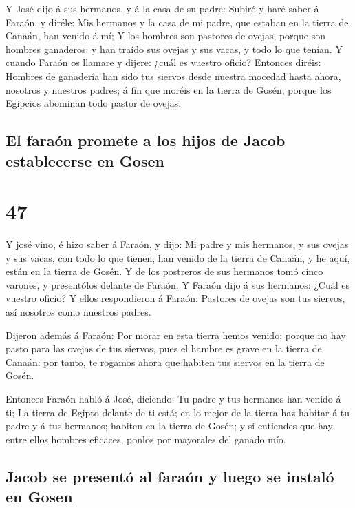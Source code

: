  Y José dijo á sus hermanos, y á la casa de su padre:
Subiré y haré saber á Faraón, y diréle: Mis hermanos y la casa de mi
padre, que estaban en la tierra de Canaán, han venido á mí;
 Y los hombres son pastores de ovejas, porque son hombres
ganaderos: y han traído sus ovejas y sus vacas, y todo lo que tenían.
 Y cuando Faraón os llamare y dijere: ¿cuál es vuestro
oficio?  Entonces diréis: Hombres de ganadería han sido tus
siervos desde nuestra mocedad hasta ahora, nosotros y nuestros padres; á
fin que moréis en la tierra de Gosén, porque los Egipcios abominan todo
pastor de ovejas.

\hypertarget{el-farauxf3n-promete-a-los-hijos-de-jacob-establecerse-en-gosen}{%
\subsection{El faraón promete a los hijos de Jacob establecerse en
Gosen}\label{el-farauxf3n-promete-a-los-hijos-de-jacob-establecerse-en-gosen}}

\hypertarget{section-46}{%
\section{47}\label{section-46}}

 Y josé vino, é hizo saber á Faraón, y dijo: Mi padre y mis
hermanos, y sus ovejas y sus vacas, con todo lo que tienen, han venido
de la tierra de Canaán, y he aquí, están en la tierra de Gosén.
 Y de los postreros de sus hermanos tomó cinco varones, y
presentólos delante de Faraón.  Y Faraón dijo á sus
hermanos: ¿Cuál es vuestro oficio? Y ellos respondieron á Faraón:
Pastores de ovejas son tus siervos, así nosotros como nuestros padres.

 Dijeron además á Faraón: Por morar en esta tierra hemos
venido; porque no hay pasto para las ovejas de tus siervos, pues el
hambre es grave en la tierra de Canaán: por tanto, te rogamos ahora que
habiten tus siervos en la tierra de Gosén.

 Entonces Faraón habló á José, diciendo: Tu padre y tus
hermanos han venido á ti;  La tierra de Egipto delante de ti
está; en lo mejor de la tierra haz habitar á tu padre y á tus hermanos;
habiten en la tierra de Gosén; y si entiendes que hay entre ellos
hombres eficaces, ponlos por mayorales del ganado mío.

\hypertarget{jacob-se-presentuxf3-al-farauxf3n-y-luego-se-instaluxf3-en-gosen}{%
\subsection{Jacob se presentó al faraón y luego se instaló en
Gosen}\label{jacob-se-presentuxf3-al-farauxf3n-y-luego-se-instaluxf3-en-gosen}}

